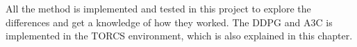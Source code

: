 All the method is implemented and tested in this project to explore the differences and get a knowledge of how they worked. The DDPG and A3C is implemented in the TORCS environment, which is also explained in this chapter. 








